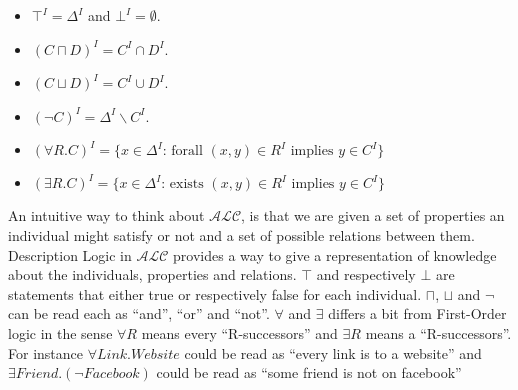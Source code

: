 \begin{itemize}
\item $\top^{I} = \Delta^{I}$ and $\bot^{I} = \emptyset$.
\item $(C \sqcap D)^{I} = C^{I} \cap D^{I}$.
\item $(C \sqcup D)^{I} = C^{I} \cup D^{I}$.
\item $(\neg C)^{I} = \Delta^{I} \backslash C^{I}$.
\item $(\forall R . C)^{I} = \{x \in \Delta^{I} \text{: forall } (x,y) \in R^{I} \text{ implies } y \in C^{I}\}$ 
\item $(\exists R . C)^{I} = \{x \in \Delta^{I} \text{: exists } (x,y) \in R^{I} \text{ implies } y \in C^{I}\}$ 
\end{itemize}

An intuitive way to think about $\mathcal{ALC}$, is that we are given a set of properties an individual might 
satisfy or not and a set of possible relations between them. Description Logic in $\mathcal{ALC}$ provides a way
to give a representation of knowledge about the individuals, properties and relations. 
$\top$ and respectively $\bot$ are statements that either true or respectively false for each individual. 
$\sqcap$, $\sqcup$ and $\neg$ can be read each as ``and'', ``or'' and ``not''. $\forall$ and $\exists$ differs
a bit from First-Order logic in the sense $\forall R$ means every ``R-successors'' and $\exists R$ means a
``R-successors''. For instance 
$\forall Link . Website$ could be read as ``every link is to a website'' and
$\exists Friend . (\neg Facebook)$ could be read as ``some friend is not on facebook''
